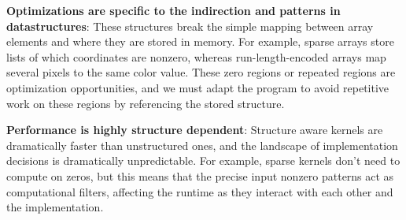 %
%

\textbf{Optimizations are specific to the indirection and patterns in datastructures}: These structures break the simple mapping between array elements and where they are stored in memory. For example, sparse arrays store lists of which coordinates are nonzero, whereas run-length-encoded arrays map several pixels to the same color value. These zero regions or repeated regions are optimization opportunities, and we must adapt the program to avoid repetitive work on these regions by referencing the stored structure.

\textbf{Performance is highly structure dependent}: Structure aware kernels are dramatically faster than unstructured ones, and the landscape of implementation decisions is dramatically unpredictable. For example, sparse kernels don't need to compute on zeros, but this means that the precise input nonzero patterns act as computational filters, affecting the runtime as they interact with each other and the implementation.

